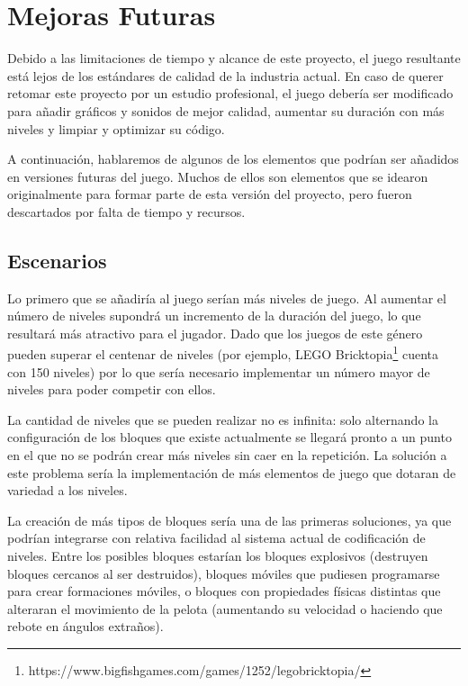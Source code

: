 \section{Mejoras Futuras}
Debido a las limitaciones de tiempo y alcance de este proyecto, el juego resultante está lejos de los estándares de calidad de la industria actual. En caso de querer retomar este proyecto por un estudio profesional, el juego debería ser modificado para añadir gráficos y sonidos de mejor calidad, aumentar su duración con más niveles y limpiar y optimizar su código.

A continuación, hablaremos de algunos de los elementos que podrían ser añadidos en versiones futuras del juego. Muchos de ellos son elementos que se idearon originalmente para formar parte de esta versión del proyecto, pero fueron descartados por falta de tiempo y recursos.

\subsection{Escenarios}
Lo primero que se añadiría al juego serían más niveles de juego. Al aumentar el número de niveles supondrá un incremento de la duración del juego, lo que resultará más atractivo para el jugador. Dado que los juegos de este género pueden superar el centenar de niveles (por ejemplo, LEGO Bricktopia\footnote{https://www.bigfishgames.com/games/1252/legobricktopia/} cuenta con 150 niveles) por lo que sería necesario implementar un número mayor de niveles para poder competir con ellos.

La cantidad de niveles que se pueden realizar no es infinita: solo alternando la configuración de los bloques que existe actualmente se llegará pronto a un punto en el que no se podrán crear más niveles sin caer en la repetición. La solución a este problema sería la implementación de más elementos de juego que dotaran de variedad a los niveles.

La creación de más tipos de bloques sería una de las primeras soluciones, ya que podrían integrarse con relativa facilidad al sistema actual de codificación de niveles. Entre los posibles bloques estarían los bloques explosivos (destruyen bloques cercanos al ser destruidos), bloques móviles que pudiesen programarse para crear formaciones móviles, o bloques con propiedades físicas distintas que alteraran el movimiento de la pelota (aumentando su velocidad o haciendo que rebote en ángulos extraños).

